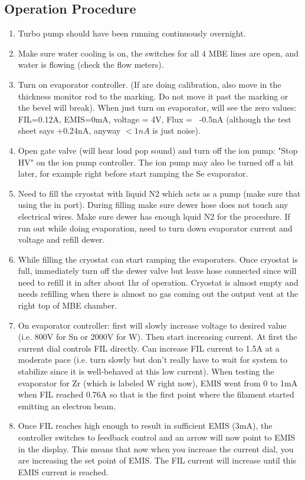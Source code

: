 \subsection{Operation Procedure}
\begin{enumerate}
\item	Turbo pump should have been running continuously overnight. 
\item	Make sure water cooling is on, the switches for all 4 MBE lines are open, and water is flowing (check the flow meters). 
\item	Turn on evaporator controller. (If are doing calibration, also move in the thickness monitor rod to the marking. Do not move it past the marking or the bevel will break). When just turn on evaporator, will see the zero values: FIL=0.12A, EMIS=0mA, voltage = 4V, Flux = ~-0.5nA (although the test sheet says +0.24nA, anyway $<1nA$ is just noise).
\item	Open gate valve (will hear loud pop sound) and turn off the ion pump: "Stop HV" on the ion pump controller. The ion pump may also be turned off a bit later, for example right before start ramping the Se evaporator.
\item	Need to fill the cryostat with liquid N2 which acts as a pump (make sure that using the in port). During filling make sure dewer hose does not touch any electrical wires. Make sure dewer has enough lquid N2 for the procedure. If run out while doing evaporation, need to turn down evaporator current and voltage and refill dewer.
\item	While filling the cryostat can start ramping the evaporaters. Once cryostat is full, immediately turn off the dewer valve but leave hose connected since will need to refill it in after about 1hr of operation. Cryostat is almost empty and needs refilling when there is almost no gas coming out the output vent at the right top of MBE chamber.
\item	On evaporator controller: first will slowly increase voltage to desired value (i.e. 800V for Sn or 2000V for W). Then start increasing current. At first the current dial controls FIL directly. Can increase FIL current to 1.5A at a moderate pace (i.e. turn slowly but don’t really have to wait for system to stabilize since it is well-behaved at this low current). When testing the evaporator for Zr (which is labeled W right now), EMIS went from 0 to 1mA when FIL reached 0.76A so that is the first point where the filament started emitting an electron beam.
\item	Once FIL reaches high enough to result in sufficient EMIS (3mA), the controller switches to feedback control and an arrow will now point to EMIS in the display. This means that now when you increase the current dial, you are increasing the set point of EMIS. The FIL current will increase until this EMIS current is reached.

\end{enumerate}
